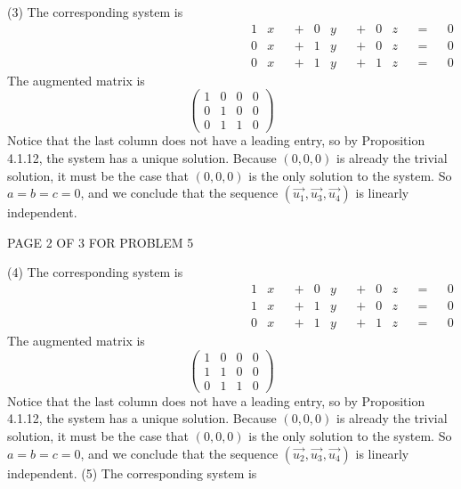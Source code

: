 \documentclass[12pt]{article}
\newenvironment{problem}[2][Problem]
{
	\begin{trivlist} 
		\item[\hskip \labelsep {\bfseries #1 #2:}]
	}
{
	\end{trivlist}
	}
\begin{document}
\begin{problem}{6}
\newline
\newline
\noindent
(3)
The corresponding system is
\begin{align*}
&&&&&&&& &&&&&&&& &&&&&&&& 1&x& &+& 0&y& &+& 0&z& &=& &0& &&&&&&&& &&&&&&&& &&&&&&&&\\
&&&&&&&& &&&&&&&& &&&&&&&& 0&x& &+& 1&y& &+& 0&z& &=& &0& &&&&&&&& &&&&&&&& &&&&&&&&\\
&&&&&&&& &&&&&&&& &&&&&&&& 0&x& &+& 1&y& &+& 1&z& &=& &0& &&&&&&&& &&&&&&&& &&&&&&&&
\end{align*}
The augmented matrix is
\[
\begin{pmatrix}1&0&0&0\\0&1&0&0\\0&1&1&0\end{pmatrix}
\]
Notice that the last column does not have a leading entry, so by Proposition 4.1.12, the system has a unique solution. Because $(0,0,0)$ is already the trivial solution, it must be the case that $(0,0,0)$ is the only solution to the system. So $a=b=c=0$, and we conclude that the sequence $(\vec{u_1},\vec{u_3},\vec{u_4})$ is linearly independent.
\newline
\newline
\noindent
\vfill
\centerline{PAGE 2 OF 3 FOR PROBLEM 5}
\noindent
(4)
The corresponding system is
\begin{align*}
&&&&&&&& &&&&&&&& &&&&&&&& 1&x& &+& 0&y& &+& 0&z& &=& &0& &&&&&&&& &&&&&&&& &&&&&&&&\\
&&&&&&&& &&&&&&&& &&&&&&&& 1&x& &+& 1&y& &+& 0&z& &=& &0& &&&&&&&& &&&&&&&& &&&&&&&&\\
&&&&&&&& &&&&&&&& &&&&&&&& 0&x& &+& 1&y& &+& 1&z& &=& &0& &&&&&&&& &&&&&&&& &&&&&&&&
\end{align*}
The augmented matrix is
\[
\begin{pmatrix}1&0&0&0\\1&1&0&0\\0&1&1&0\end{pmatrix}
\]
Notice that the last column does not have a leading entry, so by Proposition 4.1.12, the system has a unique solution. Because $(0,0,0)$ is already the trivial solution, it must be the case that $(0,0,0)$ is the only solution to the system. So $a=b=c=0$, and we conclude that the sequence $(\vec{u_2},\vec{u_3},\vec{u_4})$ is linearly independent.
\newline
\newline
\noindent
(5)
The corresponding system is
\begin{align*}

\end{align*}
\end{problem}
\end{document}
